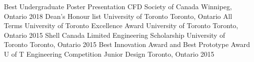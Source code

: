 \begin{cvhonors}
\cvhonor
    {Best Undergraduate Poster Presentation}
    {CFD Society of Canada}
    {Winnipeg, Ontario}
    {2018}  
\cvhonor
    {Dean's Honour list}
    {University of Toronto}
    {Toronto, Ontario}
    {All Terms}  
\cvhonor
    {University of Toronto Excellence Award}
    {University of Toronto}
    {Toronto, Ontario}
    {2015}   
\cvhonor
    {Shell Canada Limited Engineering Scholarship}
    {University of Toronto}
    {Toronto, Ontario}
    {2015}      
\cvhonor
    {Best Innovation Award and Best Prototype Award}
    {U of T Engineering Competition Junior Design}
    {Toronto, Ontario}
    {2015}    
\end{cvhonors}